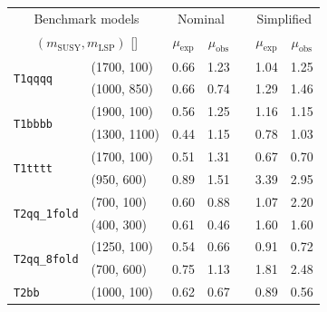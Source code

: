 \begin{table}[!t]
  \label{tab:susy_aggr_limits}
  \centering
  \begin{tabular}{ llccccc }
    \hline
    \multicolumn{2}{c}{Benchmark models}    & \multicolumn{2}{c}{Nominal}
                                            & 
                                            & \multicolumn{2}{c}{Simplified}             \\ [0.3ex]
    \cline{3-4}
    \cline{6-7}
    \multicolumn{2}{c}{$(m_{\text{SUSY}}, m_{\mathrm{LSP}})$ [\GeVns{}]} 
                                            & $\mu_{\text{exp}}$
                                            & $\mu_{\text{obs}}$
                                            & 
                                            & $\mu_{\text{exp}}$
                                            & $\mu_{\text{obs}}$                         \\ [0.3ex]
    \hline
    \multirow{2}{*}{\texttt{T1qqqq}}        & (1700, 100)   & 0.66 & 1.23 &  & 1.04 & 1.25 \\
                                            & (1000, 850)   & 0.66 & 0.74 &  & 1.29 & 1.46 \\ [0.5ex]
    \multirow{2}{*}{\texttt{T1bbbb}}        & (1900, 100)   & 0.56 & 1.25 &  & 1.16 & 1.15 \\
                                            & (1300, 1100)  & 0.44 & 1.15 &  & 0.78 & 1.03 \\ [0.5ex]
    \multirow{2}{*}{\texttt{T1tttt}}        & (1700, 100)   & 0.51 & 1.31 &  & 0.67 & 0.70 \\
                                            & (950, 600)    & 0.89 & 1.51 &  & 3.39 & 2.95 \\ [0.5ex]
    \multirow{2}{*}{\texttt{T2qq\_1fold}}   & (700, 100)    & 0.60 & 0.88 &  & 1.07 & 2.20 \\
                                            & (400, 300)    & 0.61 & 0.46 &  & 1.60 & 1.60 \\ [0.5ex]
    \multirow{2}{*}{\texttt{T2qq\_8fold}}   & (1250, 100)   & 0.54 & 0.66 &  & 0.91 & 0.72 \\
                                            & (700, 600)    & 0.75 & 1.13 &  & 1.81 & 2.48 \\ [0.5ex]
    \multirow{2}{*}{\texttt{T2bb}}          & (1000, 100)   & 0.62 & 0.67 &  & 0.89 & 0.56 \\

\end{tabular}
\end{table}
